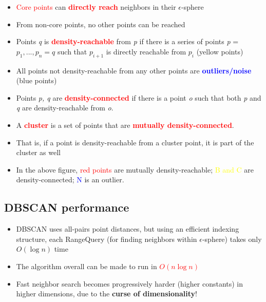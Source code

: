 \documentclass[11pt]{article}
\begin{document}
\begin{itemize}
	\item \textcolor{red}{Core points} can \textbf{\textcolor{red}{directly reach}} neighbors in their $\epsilon$-sphere 
	\item From non-core points, no other points can be reached
	\item Points \textit{q} is \textbf{\textcolor{red}{density-reachable}} from \textit{p} if there is a series of points \textit{p} = $p_1, ..., p_n = q$ such that $p_{i+1}$ is directly reachable from $p_i$ (yellow points)
	\item All points not density-reachable from any other points are \textbf{\textcolor{blue}{outliers/noise}} (blue points)
	\item Points \textit{p, q} are \textbf{\textcolor{red}{density-connected}} if there is a point \textit{o} such that both \textit{p} and \textit{q} are density-reachable from \textit{o}.
	\item A \textcolor{red}{\textbf{cluster}} is a set of points that are \textbf{\textcolor{red}{mutually density-connected}}.
	\item That is, if a point is density-reachable from a cluster point, it is part of the cluster as well
	\item In the above figure, \textcolor{red}{red points} are mutually density-reachable; \textcolor{yellow}{B and C} are density-connected; \textcolor{blue}{N} is an outlier. 
\end{itemize}

\subsection*{DBSCAN performance}
\begin{itemize}
	\item DBSCAN uses all-pairs point distances, but using an efficient indexing structure, each RangeQuery (for finding neighbors within $\epsilon$-sphere) takes only $O(\log{n})$ time
	\item The algorithm overall can be made to run in \textcolor{red}{$O(n \log{n})$}
	\item Fast neighbor search becomes progressively harder (higher constants) in higher dimensions, due to the \textbf{curse of dimensionality}!
\end{itemize}
\end{document}
